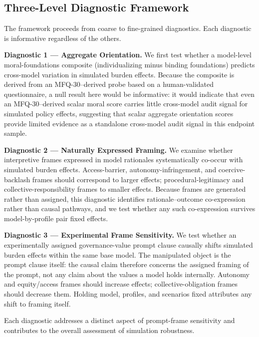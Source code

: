 \documentclass[12pt,a4paper]{article}
\begin{document}
\subsection{Three-Level Diagnostic Framework}
\label{sec:diagnostics}

The framework proceeds from coarse to fine-grained diagnostics. Each diagnostic is informative regardless of the others.

\textbf{Diagnostic 1 --- Aggregate Orientation.} We first test whether a model-level moral-foundations composite (individualizing minus binding foundations) predicts cross-model variation in simulated burden effects. Because the composite is derived from an MFQ-30--derived probe based on a human-validated questionnaire, a null result here would be informative: it would indicate that even an MFQ-30--derived scalar moral score carries little cross-model audit signal for simulated policy effects, suggesting that scalar aggregate orientation scores provide limited evidence as a standalone cross-model audit signal in this endpoint sample.

\textbf{Diagnostic 2 --- Naturally Expressed Framing.} We examine whether interpretive frames expressed in model rationales systematically co-occur with simulated burden effects. Access-barrier, autonomy-infringement, and coercive-backlash frames should correspond to larger effects; procedural-legitimacy and collective-responsibility frames to smaller effects. Because frames are generated rather than assigned, this diagnostic identifies rationale--outcome co-expression rather than causal pathways, and we test whether any such co-expression survives model-by-profile pair fixed effects.

\textbf{Diagnostic 3 --- Experimental Frame Sensitivity.} We test whether an experimentally assigned governance-value prompt clause causally shifts simulated burden effects within the same base model. The manipulated object is the prompt clause itself: the causal claim therefore concerns the assigned framing of the prompt, not any claim about the values a model holds internally. Autonomy and equity/access frames should increase effects; collective-obligation frames should decrease them. Holding model, profiles, and scenarios fixed attributes any shift to framing itself.

Each diagnostic addresses a distinct aspect of prompt-frame sensitivity and contributes to the overall assessment of simulation robustness.
\end{document}
